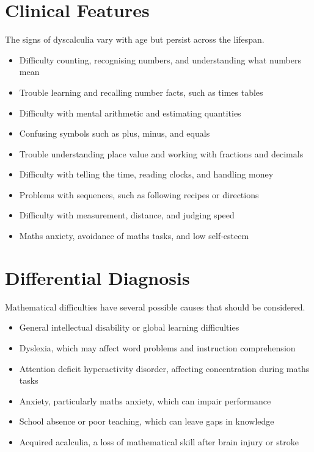 \section*{Clinical Features}
The signs of dyscalculia vary with age but persist across the lifespan.
\begin{itemize}
    \item Difficulty counting, recognising numbers, and understanding what numbers mean
    \item Trouble learning and recalling number facts, such as times tables
    \item Difficulty with mental arithmetic and estimating quantities
    \item Confusing symbols such as plus, minus, and equals
    \item Trouble understanding place value and working with fractions and decimals
    \item Difficulty with telling the time, reading clocks, and handling money
    \item Problems with sequences, such as following recipes or directions
    \item Difficulty with measurement, distance, and judging speed
    \item Maths anxiety, avoidance of maths tasks, and low self-esteem
\end{itemize}

\section*{Differential Diagnosis}
Mathematical difficulties have several possible causes that should be considered.
\begin{itemize}
    \item General intellectual disability or global learning difficulties
    \item Dyslexia, which may affect word problems and instruction comprehension
    \item Attention deficit hyperactivity disorder, affecting concentration during maths tasks
    \item Anxiety, particularly maths anxiety, which can impair performance
    \item School absence or poor teaching, which can leave gaps in knowledge
    \item Acquired acalculia, a loss of mathematical skill after brain injury or stroke
\end{itemize}

